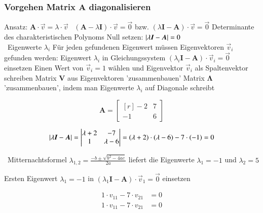 \subsubsection{Vorgehen Matrix $\bm{A}$ diagonalisieren}

\begin{outline}
    \1 Ansatz: $ \bm{A} \cdot \vec{v} = \lambda \cdot \vec{v}$ \textrightarrow\ $(\bm{A} - \lambda \bm{I}) \cdot \vec{v} = \vec{0}$ bzw. 
        $(\lambda \bm{I} - \bm{A}) \cdot \vec{v} = \vec{0}$
    \1 Determinante des charakteristischen Polynoms Null setzen: $\left|\lambda \bm{I} - \bm{A}\right| = 0$ \\
        \textrightarrow\ Eigenwerte $\lambda_i$ 
    \1 Für jeden gefundenen Eigenwert müssen Eigenvektoren $\vec{v}_i$ gefunden werden:
        \2 Eigenwert $\lambda_i$ in Gleichungssystem $(\lambda_i \bm{I} - \bm{A}) \cdot \vec{v}_i = \vec{0}$ einsetzen
        \2 Einen Wert von $\vec{v}_i = 1$ wählen und Eigenvektor $\vec{v}_i$ als Spaltenvektor schreiben
    \1 Matrix $\bm{V}$ aus Eigenvektoren 'zusammenbauen'
    \1 Matrix $\bm{\Lambda}$ 'zusammenbauen', indem man Eigenwerte $\lambda_i$ auf Diagonale schreibt
\end{outline}



\begin{minipage}[c]{0.25\columnwidth}
    $$ \bm{A} = \begin{bmatrix*}[r]
        -2 & 7 \\
        -1 & 6 
    \end{bmatrix*}$$ 
\end{minipage}
\hfill
\begin{minipage}[c]{0.72\columnwidth}
    $$ \abs{\lambda \bm{I} - \bm{A}} = \begin{vmatrix*}[c]
        \lambda + 2 & -7 \\
        1 & \lambda - 6 
    \end{vmatrix*} = (\lambda + 2) \cdot (\lambda - 6) - 7 \cdot (-1) = 0 $$
\end{minipage}

\textrightarrow\ Mitternachtsformel $\lambda_{1,2} =\frac{-b \pm \sqrt{b^2 - 4 a c}}{2a}$ liefert die Eigenwerte $\lambda_1 = -1$ und $\lambda_2 = 5$

\begin{minipage}[t]{0.56\columnwidth}
    Ersten Eigenwert $\lambda_1 = -1$ in $(\lambda_1 \bm{I} - \bm{A}) \cdot \vec{v}_1 = \vec{0}$ einsetzen
\end{minipage}
\hfill
\begin{minipage}[c]{0.4\columnwidth}
    \begin{align*}
        1 \cdot v_{11} - 7 \cdot v_{21} &= 0 \\
        1 \cdot v_{11} - 7 \cdot v_{21} &= 0 
    \end{align*}
\end{minipage}

